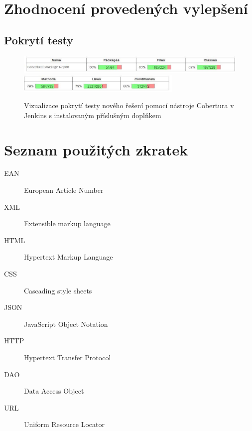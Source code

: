 \documentclass[thesis=B,czech]{FITthesis}[2012/06/26]
\begin{document}
\chapter{Zhodnocení provedených vylepšení}


\section{Pokrytí testy}
\begin{figure}[h]\centering
 	\includegraphics[width=1.0\textwidth]{resources/cobertura-report-new-1}
 	\includegraphics[width=0.7\textwidth]{resources/cobertura-report-new-2}
	\caption[Pokrytí testy po provedených vylepšení]{Vizualizace pokrytí testy nového řešení pomocí nástroje Cobertura v	Jenkins s instalovaným příslušným doplňkem}\label{fig:cober-new}
\end{figure}


\begin{conclusion}
\end{conclusion}





\appendix
\chapter{Seznam použitých zkratek}
\begin{description}
	\item[EAN] European Article Number
	\item[XML] Extensible markup language
	\item[HTML] Hypertext Markup Language
	\item[CSS] Cascading style sheets
	\item[JSON] JavaScript Object Notation
	\item[HTTP] Hypertext Transfer Protocol
	\item[DAO] Data Access Object
	\item[URL] Uniform Resource Locator

\end{description}
\end{document}

